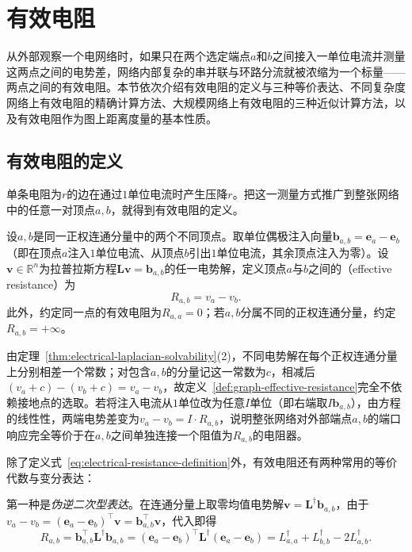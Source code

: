 \section{有效电阻}
\label{sec:graph-effective-resistance}

从外部观察一个电网络时，如果只在两个选定端点$a$和$b$之间接入一单位电流并测量这两点之间的电势差，网络内部复杂的串并联与环路分流就被浓缩为一个标量——两点之间的有效电阻。本节依次介绍有效电阻的定义与三种等价表达、不同复杂度网络上有效电阻的精确计算方法、大规模网络上有效电阻的三种近似计算方法，以及有效电阻作为图上距离度量的基本性质。

\subsection{有效电阻的定义}
\label{sec:electrical-resistance-definition}

单条电阻为$r$的边在通过$1$单位电流时产生压降$r$。把这一测量方式推广到整张网络中的任意一对顶点$a,b$，就得到有效电阻的定义。

\begin{definition}[有效电阻]
\label{def:graph-effective-resistance}
设$a,b$是同一正权连通分量中的两个不同顶点。取单位偶极注入向量$\bm b_{a,b} = \bm e_a - \bm e_b$（即在顶点$a$注入$1$单位电流、从顶点$b$引出$1$单位电流，其余顶点注入为零）。设$\bm v\in\mathbb R^n$为拉普拉斯方程$\bm L\bm v = \bm b_{a,b}$的任一电势解，定义顶点$a$与$b$之间的（effective resistance）为
\begin{equation}
  R_{a,b} = v_a - v_b.
  \label{eq:electrical-resistance-definition}
\end{equation}
此外，约定同一点的有效电阻为$R_{a,a} = 0$；若$a,b$分属不同的正权连通分量，约定$R_{a,b} = +\infty$。
\end{definition}

由定理~\ref{thm:electrical-laplacian-solvability}(2)，不同电势解在每个正权连通分量上分别相差一个常数；对包含$a,b$的分量记这一常数为$c$，相减后$(v_a+c)-(v_b+c)=v_a-v_b$，故定义~\ref{def:graph-effective-resistance}完全不依赖接地点的选取。若将注入电流从$1$单位改为任意$I$单位（即右端取$I\bm b_{a,b}$），由方程的线性性，两端电势差变为$v_a - v_b = I\cdot R_{a,b}$，说明整张网络对外部端点$a,b$的端口响应完全等价于在$a,b$之间单独连接一个阻值为$R_{a,b}$的电阻器。

除了定义式~\eqref{eq:electrical-resistance-definition}外，有效电阻还有两种常用的等价代数与变分表达：

第一种是\emph{伪逆二次型表达}。在连通分量上取零均值电势解$\bm v = \bm L^\dagger \bm b_{a,b}$，由于$v_a - v_b = (\bm e_a - \bm e_b)^\top\bm v = \bm b_{a,b}^\top\bm v$，代入即得
\begin{equation}
  R_{a,b}
  = \bm b_{a,b}^\top \bm L^\dagger \bm b_{a,b}
  = (\bm e_a - \bm e_b)^\top \bm L^\dagger (\bm e_a - \bm e_b)
  = L^\dagger_{a,a} + L^\dagger_{b,b} - 2L^\dagger_{a,b}.
  \label{eq:electrical-resistance-pseudoinverse}
\end{equation}

